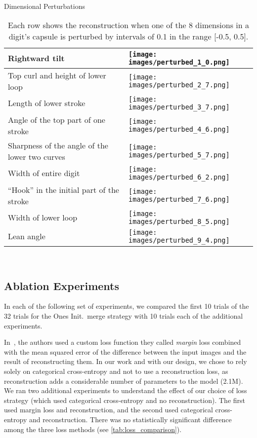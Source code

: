\documentclass{article}
\begin{document}
\begin{table}[!ht]
  \caption{Dimensional Perturbations}
  \centering
  \setlength\tabcolsep{1pt}
  \begin{tabularx}{\textwidth}{@{}Xm{3.25in}@{}}
    \toprule
    Rightward tilt & \texttt{[image: images/perturbed\_1\_0.png]} \\
    \midrule
      Top curl and height of lower loop & \texttt{[image: images/perturbed\_2\_7.png]} \\
    \midrule
      Length of lower stroke & \texttt{[image: images/perturbed\_3\_7.png]} \\
    \midrule
      Angle of the top part of one stroke & \texttt{[image: images/perturbed\_4\_6.png]} \\
    \midrule
      Sharpness of the angle of the lower two curves & \texttt{[image: images/perturbed\_5\_7.png]} \\
    \midrule
      Width of entire digit & \texttt{[image: images/perturbed\_6\_2.png]} \\
    \midrule
      ``Hook'' in the initial part of the stroke & \texttt{[image: images/perturbed\_7\_6.png]} \\
    \midrule
      Width of lower loop & \texttt{[image: images/perturbed\_8\_5.png]} \\
    \midrule
      Lean angle & \texttt{[image: images/perturbed\_9\_4.png]} \\
    \bottomrule
  \end{tabularx}\\[0.05in]\label{tab:dimensional_pertrubations}
  \captionsetup{justification=justified,singlelinecheck=false}
  \caption*{Each row shows the reconstruction when one of the 8 dimensions in a digit's capsule is perturbed by intervals of 0.1 in the range [-0.5, 0.5].}
\end{table}

\subsection{Ablation Experiments}

In each of the following set of experiments, we compared the first 10 trials of the 32 trials for the Ones Init.\ merge strategy with 10 trials each of the additional experiments.

In~\cite{Sabour2017}, the authors used a custom loss function they called \textit{margin} loss combined with the mean squared error of the difference between the input images and the result of reconstructing them.  In our work and with our design, we chose to rely solely on categorical cross-entropy and not to use a reconstruction loss, as reconstruction adds a considerable number of parameters to the model (2.1M).  We ran two additional experiments to understand the effect of our choice of loss strategy (which used categorical cross-entropy and no reconstruction).  The first used margin loss and reconstruction, and the second used categorical cross-entropy and reconstruction.  There was no statistically significant difference among the three loss methods (see \autoref{tab:loss_comparison}).
\end{document}
